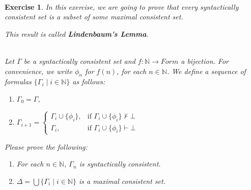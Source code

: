 \documentclass[12pt,a4paper]{article}
\theoremstyle{plain}
\newtheorem{exercise}{Exercise}
\theoremstyle{definition}
\begin{document}
\ \\
\begin{exercise}
In this exercise, we are going to prove that every syntactically consistent set is a subset of some maximal consistent set.

This result is called \textbf{Lindenbaum's Lemma}.

\ \\ 
Let $\Gamma$ be a syntactically consistent set and $f : \mathbb{N} \rightarrow Form$ a bijection.
For convenience, we write $\phi_n$ for $f (n)$, for each $n \in \mathbb{N}$.
We define a sequence of formulas $\{ \Gamma_i \mid i \in \mathbb{N} \}$ as follows:
%
\begin{enumerate}

\item $\Gamma_0 = \Gamma$,

\item $
\Gamma_{i+1} = \left \{ 
\begin{array}{ll}
\Gamma_i \cup \{ \phi_i \} , & \mbox{if } \Gamma_i \cup \{ \phi_i \} \not \vdash \bot \\
\Gamma_i , & \mbox{if } \Gamma_i \cup \{ \phi_i \} \vdash \bot 
\end{array}
\right.
$
\end{enumerate}
%
Please prove the following:
%
\begin{enumerate}

\item For each $n \in \mathbb{N}$, $\Gamma_n$ is syntactically consistent.

\item $\Delta = \bigcup \{ \Gamma_i \mid i \in \mathbb{N} \}$ is a maximal consistent set.

\end{enumerate}
\end{exercise}
\end{document}
